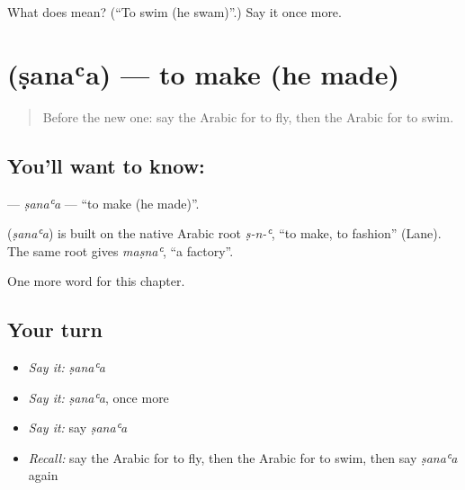 \begin{tcolorbox}[breakable,colback=teal!4,colframe=teal!35!black,title={Before you move on}]
What does  mean? (\textquotedblleft{}To swim (he swam)\textquotedblright{}.) Say it once more.
\end{tcolorbox}
\section[\texorpdfstring{\ar{صنع} (ṣanaʿa)}{صنع (ṣanaʿa)}]{ (ṣanaʿa) — to make (he made)}

\label{lesson:AR-C63-sanaa}



\begin{quote}
Before the new one: say the Arabic for to fly, then the Arabic for to swim.
\end{quote}

\subsection*{You'll want to know: }
\textbf{} — \emph{ṣanaʿa} — \textquotedblleft{}to make (he made)\textquotedblright{}.

\begin{cousinweb}
\textbf{} (\emph{ṣanaʿa}) is built on the native Arabic root \emph{ṣ-n-ʿ}, \textquotedblleft{}to make, to fashion\textquotedblright{} (Lane). The same root gives \emph{maṣnaʿ}, \textquotedblleft{}a factory\textquotedblright{}.
\end{cousinweb}

\begin{grammarlens}[title={What you've built}]
One more word for this chapter.
\end{grammarlens}

\subsection*{Your turn}
\begin{itemize}
\raggedright
  \item \emph{Say it:} \emph{ṣanaʿa}
  \item \emph{Say it:} \emph{ṣanaʿa}, once more
  \item \emph{Say it:} say \emph{ṣanaʿa}
  \item \emph{Recall:} say the Arabic for to fly, then the Arabic for to swim, then say \emph{ṣanaʿa} again
\end{itemize}

